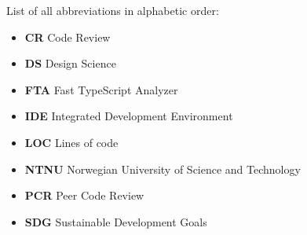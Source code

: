
List of all abbreviations in alphabetic order:

\begin{itemize}
    \item \textbf{CR} Code Review %
    \item \textbf{DS} Design Science
    \item \textbf{FTA} Fast TypeScript Analyzer
    \item \textbf{IDE} Integrated Development Environment
    \item \textbf{LOC} Lines of code %
    \item \textbf{NTNU} Norwegian University of Science and Technology
    \item \textbf{PCR} Peer Code Review
    \item \textbf{SDG} Sustainable Development Goals


    
\end{itemize}